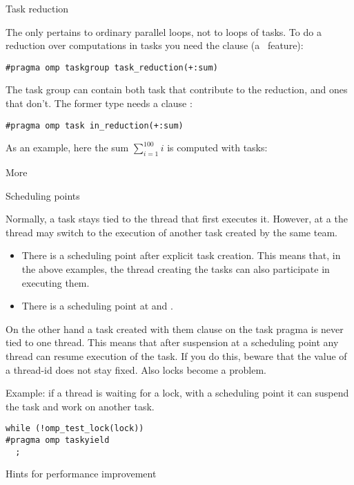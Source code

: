  {Task reduction}

The  only pertains to ordinary parallel loops,
not to  loops of tasks.
To do a reduction over computations in tasks you need the
 clause
(a~ feature):
\begin{lstlisting}
#pragma omp taskgroup task_reduction(+:sum)
\end{lstlisting}
The task group can contain both task that contribute to the reduction,
and ones that don't. The former type needs a clause :
\begin{lstlisting}
#pragma omp task in_reduction(+:sum)
\end{lstlisting}

As an example, here the sum $\sum_{i=1}^{100} i$ is computed with tasks:
%

 {More}

 {Scheduling points}

Normally, a task stays tied to the thread that first executes it.
However, at a  the thread may
switch to the execution of another task created by the same team.
\begin{itemize}
\item There is a scheduling point after explicit task creation. This
  means that, in the above examples, the thread creating the tasks can
  also participate in executing them.
\item There is a scheduling point at  and .
\end{itemize}

On the other hand a task created with them  clause
on the task pragma is never tied to one thread. This means that after
suspension at a scheduling point any thread can resume execution of
the task.
If you do this, beware
that the value of a thread-id does not stay fixed. Also locks become a problem.

Example: if a thread is waiting for a lock, with a scheduling point it
can suspend the task and work on another task.
\begin{lstlisting}
while (!omp_test_lock(lock))
#pragma omp taskyield
  ;
\end{lstlisting}

 {Hints for performance improvement}
\label{sec:omp-task-hint}

